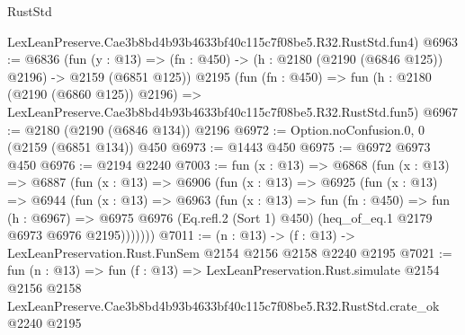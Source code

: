 \begin{lexlean}{RustStd}
\begin{coremodule}
    LexLeanPreserve.Cae3b8bd4b93b4633bf40c115c7f08be5.R32.RustStd.fun4)
@6963 := @6836
    (fun (y : @13) => (fn : @450) -> (h : @2180 (@2190 (@6846 @125)) @2196) -> @2159 (@6851 @125))
    @2195
    (fun (fn : @450) =>
    fun (h : @2180 (@2190 (@6860 @125)) @2196) =>
    LexLeanPreserve.Cae3b8bd4b93b4633bf40c115c7f08be5.R32.RustStd.fun5)
@6967 := @2180 (@2190 (@6846 @134)) @2196
@6972 := Option.noConfusion.{0, 0} (@2159 (@6851 @134)) @450
@6973 := @1443 @450
@6975 := @6972 @6973 @450
@6976 := @2194 @2240
@7003 := fun (x : @13) =>
  @6868
    (fun (x : @13) =>
    @6887
      (fun (x : @13) =>
      @6906
        (fun (x : @13) =>
        @6925
          (fun (x : @13) =>
          @6944
            (fun (x : @13) =>
            @6963
              (fun (x : @13) =>
              fun (fn : @450) =>
              fun (h : @6967) =>
              @6975 @6976 (Eq.refl.{2} (Sort 1) @450) (heq_of_eq.{1} @2179 @6973 @6976 @2195)))))))
@7011 := (n : @13) -> (f : @13) -> LexLeanPreservation.Rust.FunSem @2154 @2156 @2158 @2240 @2195
@7021 := fun (n : @13) =>
  fun (f : @13) =>
  LexLeanPreservation.Rust.simulate
    @2154
    @2156
    @2158
    LexLeanPreserve.Cae3b8bd4b93b4633bf40c115c7f08be5.R32.RustStd.crate_ok
    @2240
    @2195
\end{coremodule}
\end{lexlean}
